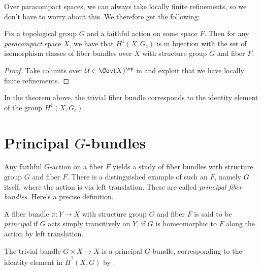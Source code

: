 \documentclass[11pt]{amsart}
\begin{document}
Over paracompact spaces, we can always take locally finite refinements, so we don't have to worry about this. We therefore get the following:

\begin{theorem}\label{thm:H1-bijection-with-fiber-bundles} 
Fix a topological group $G$ and a faithful action on some space $F$. Then for any \emph{paracompact} space $X$, we have that $H^1(X,G_c)$ is in bijection with the set of isomorphism classes of fiber bundles over $X$ with structure group $G$ and fiber $F$.
\end{theorem}
\begin{proof} Take colimits over $\mathcal{U}\in \Cov(X)^\op$ in  and exploit that we have locally finite refinements.
\end{proof}

\begin{example}
In the theorem above, the trivial fiber bundle corresponds to the identity element of the group $H^1(X,G_c)$.
\end{example}

\section{Principal $G$-bundles}

Any faithful $G$-action on a fiber $F$ yields a study of fiber bundles with structure group $G$ and fiber $F$. There is a distinguished example of such an $F$, namely $G$ itself, where the action is via left translation. These are called \emph{principal fiber bundles}. Here's a precise definition.

\begin{definition} A fiber bundle $\pi \colon Y \to X$ with structure group $G$ and fiber $F$ is said to be \emph{principal} if $G$ acts simply transitively on $Y$, if $G$ is homeomorphic to $F$ along the action by left translation.
\end{definition}

\begin{example} The trivial bundle $G \times X \to X$ is a principal $G$-bundle, corresponding to the identity element in $\check{H}^1(X,G)$ by .
\end{example}
\end{document}
